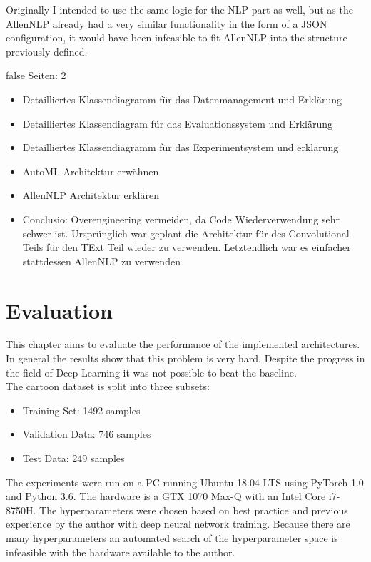 \documentclass[draft,final,oneside]{vutinfth} %
\begin{document}
Originally I intended to use the same logic for the NLP part as well, but as the AllenNLP already had a very similar functionality in the form of a JSON configuration, it would have been infeasible to fit AllenNLP into the structure previously defined.


\if false
Seiten: 2

\begin{itemize}

\item Detailliertes Klassendiagramm für das Datenmanagement und Erklärung
\item Detailliertes Klassendiagram für das Evaluationssystem und Erklärung
\item Detailliertes Klassendiagramm für das Experimentsystem und erklärung 
\item AutoML Architektur erwähnen
\item AllenNLP Architektur erklären
\item Conclusio: Overengineering vermeiden, da Code Wiederverwendung sehr schwer ist. Ursprünglich war geplant die Architektur für des Convolutional Teils für den TExt Teil wieder zu verwenden. Letztendlich war es einfacher stattdessen AllenNLP zu verwenden

\end{itemize}

\fi


\chapter{Evaluation} \label{evaluationchapter}

This chapter aims to evaluate the performance of the implemented architectures. In
general the results show that this problem is very hard. Despite the progress in the field of Deep Learning it was not possible to beat the baseline. \\

The cartoon dataset is split into three subsets:

\begin{itemize}
\item Training Set: 1492 samples %
\item Validation Data: 746 samples %
\item Test Data: 249 samples %
\end{itemize}

The experiments were run on a PC running Ubuntu 18.04 LTS using PyTorch 1.0 and Python 3.6. The hardware is a GTX 1070 Max-Q with an Intel Core i7-8750H. The hyperparameters were chosen based on best practice and previous experience by the author with deep neural network training. Because there are many hyperparameters an automated search of the hyperparameter space is infeasible with the hardware available to the author.
\end{document}
